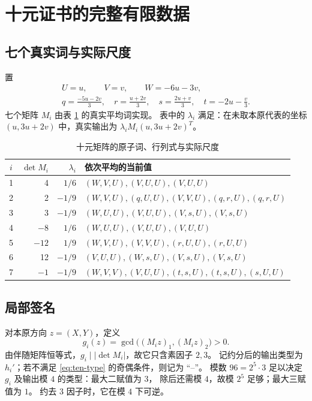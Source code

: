 \documentclass[UTF8,fontset=fandol,zihao=-4,a4paper]{ctexart}
\numberwithin{equation}{section}
\theoremstyle{definition}
\begin{document}
\section{十元证书的完整有限数据}\label{app:ten}

\subsection{七个真实词与实际尺度}

置
\begin{gather*}
 U=u,\qquad V=v,\qquad W=-6u-3v,\\
 q=\frac{-5u-2v}{3},\quad r=\frac{u+2v}{3},\quad
 s=\frac{2u+v}{3},\quad t=-2u-\frac v3.
\end{gather*}
七个矩阵 $M_i$ 由表 \ref{tab:ten-words} 的真实平均词实现。
表中的 $\lambda_i$ 满足：在未取本原代表的坐标 $(u,3u+2v)$ 中，真实输出为
$\lambda_iM_i(u,3u+2v)^T$。

\begin{table}[htbp]
\centering\small
\caption{十元矩阵的原子词、行列式与实际尺度}\label{tab:ten-words}
\begin{tabular}{crrp{}}
\toprule
$i$ & $\det M_i$ & $\lambda_i$ & 依次平均的当前值\\
\midrule
1&4&$1/6$&$(W,V,U),(V,U,U),(V,U,U)$\\
2&2&$-1/9$&$(W,V,U),(q,U,U),(V,V,U),(q,r,U),(q,r,U)$\\
3&3&$-1/9$&$(W,U,U),(V,U,U),(V,s,U),(V,s,U)$\\
4&$-8$&$1/6$&$(W,U,U),(V,U,U),(V,U,U)$\\
5&$-12$&$1/9$&$(W,V,U),(V,V,U),(r,U,U),(r,U,U)$\\
6&12&$-1/9$&$(V,U,U),(W,s,U),(V,s,U),(V,s,U)$\\
7&$-1$&$-1/9$&$(W,V,V),(V,U,U),(t,s,U),(t,s,U),(s,U,U)$\\
\bottomrule
\end{tabular}
\end{table}

\subsection{局部签名}

对本原方向 $z=(X,Y)$，定义
\[
 g_i(z)=\gcd\bigl((M_iz)_1,(M_iz)_2\bigr)>0.
\]
由伴随矩阵恒等式，$g_i\mid|\det M_i|$，故它只含素因子 $2,3$。
记约分后的输出类型为 $h_i'$；若不满足 \eqref{eq:ten-type} 的奇偶条件，则记为 ``--''。
模数 $96=2^5\cdot3$ 足以决定 $g_i$ 及输出模 $4$ 的类型：最大二赋值为 $3$，
除后还需模 $4$，故模 $2^5$ 足够；最大三赋值为 $1$。
约去 $3$ 因子时，它在模 $4$ 下可逆。
\end{document}
